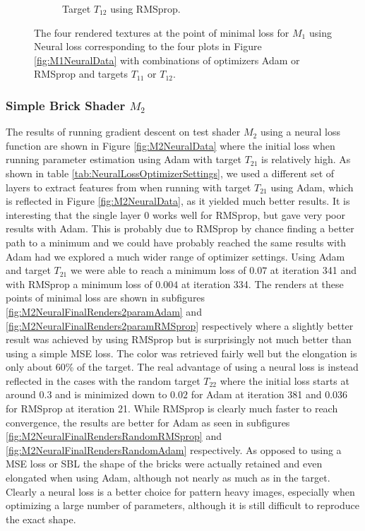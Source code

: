 \begin{figure}
\begin{subfigure}[t]{.25\textwidth}
    \caption{Target $T_{12}$ using RMSprop.}
    \label{fig:M1NeuralFinalRendersRandomRMSprop}
\end{subfigure}
\caption{The four rendered textures at the point of minimal loss for $M_1$ using Neural loss corresponding to the four plots in Figure \ref{fig:M1NeuralData} with combinations of optimizers Adam or RMSprop and targets $T_{11}$ or $T_{12}$.}
\label{fig:M1NeuralFinalRenders}
\end{figure}

\subsubsection{Simple Brick Shader $M_2$}

The results of running gradient descent on test shader $M_2$ using a neural loss function are shown in Figure \ref{fig:M2NeuralData} where the initial loss when running parameter estimation using Adam with target $T_{21}$ is relatively high. As shown in table \ref{tab:NeuralLossOptimizerSettings}, we used a different set of layers to extract features from when running with target $T_{21}$ using Adam, which is reflected in Figure \ref{fig:M2NeuralData}, as it yielded much better results. It is interesting that the single layer 0 works well for RMSprop, but gave very poor results with Adam. This is probably due to RMSprop by chance finding a better path to a minimum and we could have probably reached the same results with Adam had we explored a much wider range of optimizer settings. Using Adam and target $T_{21}$ we were able to reach a minimum loss of $0.07$ at iteration 341 and with RMSprop a minimum loss of $0.004$ at iteration 334. The renders at these points of minimal loss are shown in subfigures \ref{fig:M2NeuralFinalRenders2paramAdam} and \ref{fig:M2NeuralFinalRenders2paramRMSprop} respectively where a slightly better result was achieved by using RMSprop but is surprisingly not much better than using a simple MSE loss. The color was retrieved fairly well but the elongation is only about 60\% of the target. The real advantage of using a neural loss is instead reflected in the cases with the random target $T_{22}$ where the initial loss starts at around $0.3$ and is minimized down to $0.02$ for Adam at iteration 381 and $0.036$ for RMSprop at iteration 21. While RMSprop is clearly much faster to reach convergence, the results are better for Adam as seen in subfigures \ref{fig:M2NeuralFinalRendersRandomRMSprop} and \ref{fig:M2NeuralFinalRendersRandomAdam} respectively. As opposed to using a MSE loss or SBL the shape of the bricks were actually retained and even elongated when using Adam, although not nearly as much as in the target. Clearly a neural loss is a better choice for pattern heavy images, especially when optimizing a large number of parameters, although it is still difficult to reproduce the exact shape.

